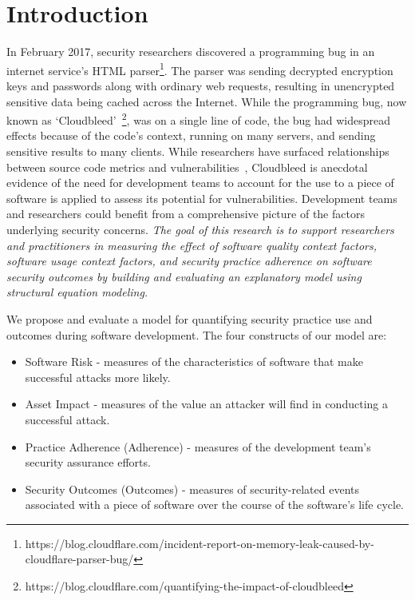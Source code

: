 \section{Introduction}
\label{sec:intro}

In February 2017, security researchers discovered a programming bug in an internet service's HTML parser\footnote{https://blog.cloudflare.com/incident-report-on-memory-leak-caused-by-cloudflare-parser-bug/}. The parser was sending decrypted encryption keys and passwords along with ordinary web requests, resulting in unencrypted sensitive data being cached across the Internet. While the programming bug, now known as `Cloudbleed'~\footnote{https://blog.cloudflare.com/quantifying-the-impact-of-cloudbleed}, was on a single line of code, the bug had widespread effects because of the code's context, running on many servers, and sending sensitive results to many clients.   While researchers have surfaced relationships between source code metrics and vulnerabilities~\cite{zimmerman2010searching,alhazmi2007measuring,meneely2013when,shin2011evaluating}, Cloudbleed is anecdotal evidence of the need for development teams to account for the use to a piece of software is applied to assess its potential for vulnerabilities.  Development teams and researchers could benefit from a comprehensive picture of the factors underlying security concerns.
\textit{The goal of this research is to support researchers and practitioners in measuring the effect of software quality context factors, software usage context factors, and security practice adherence on software security outcomes by building and evaluating an explanatory model using structural equation modeling.}

We propose and evaluate a model for quantifying security practice use and outcomes during software development. The four constructs of our model are:
\begin{itemize}
	\item Software Risk - measures of the characteristics of software that make successful attacks more likely.	
	\item Asset Impact - measures of the value an attacker will find in conducting a successful attack.
	\item Practice Adherence (Adherence) - measures of the development team's security assurance efforts. 
	\item Security Outcomes (Outcomes) - measures of security-related events associated with a piece of software over the course of the software's life cycle.
\end{itemize}

